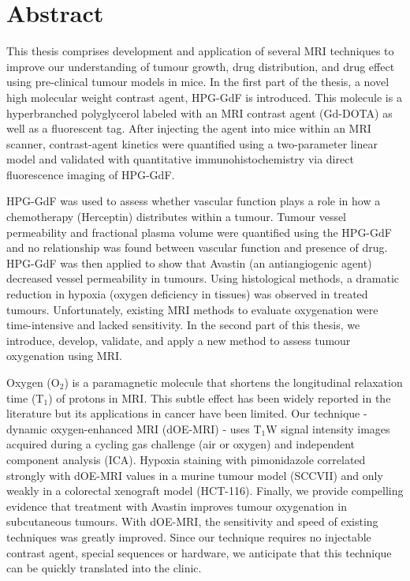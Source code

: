 
\chapter{Abstract}

This thesis comprises development and application of several MRI techniques to improve our understanding of tumour growth, drug distribution, and drug effect using pre-clinical tumour models in mice. In the first part of the thesis, a novel high molecular weight contrast agent, HPG-GdF is introduced. This molecule is a hyperbranched polyglycerol labeled with an MRI contrast agent (Gd-DOTA) as well as a fluorescent tag. After injecting the agent into mice within an MRI scanner, contrast-agent kinetics were quantified using a two-parameter linear model and validated with quantitative immunohistochemistry via direct fluorescence imaging of HPG-GdF.

HPG-GdF was used to assess whether vascular function plays a role in how a chemotherapy (Herceptin) distributes within a tumour. Tumour vessel permeability and fractional plasma volume were quantified using the HPG-GdF and no relationship was found between vascular function and presence of drug. HPG-GdF was then applied to show that Avastin (an antiangiogenic agent) decreased vessel permeability in tumours. Using histological methods, a dramatic reduction in hypoxia (oxygen deficiency in tissues) was observed in treated tumours. Unfortunately, existing MRI methods to evaluate oxygenation were time-intensive and lacked sensitivity. In the second part of this thesis, we introduce, develop, validate, and apply a new method to assess tumour oxygenation using MRI. 

Oxygen (O$_2$) is a paramagnetic molecule that shortens the longitudinal relaxation time (T$_1$) of protons in MRI. This subtle effect has been widely reported in the literature but its applications in cancer have been limited. Our technique - dynamic oxygen-enhanced MRI (\acs{dOE-MRI}) - uses T$_1$W signal intensity images acquired during a cycling gas challenge (air or oxygen) and independent component analysis (ICA). Hypoxia staining with pimonidazole correlated strongly with \acs{dOE-MRI} values in a murine tumour model (SCCVII) and only weakly in a colorectal xenograft model (HCT-116). Finally, we provide compelling evidence that treatment with Avastin improves tumour oxygenation in subcutaneous tumours. With \acs{dOE-MRI}, the sensitivity and speed of existing techniques was greatly improved. Since our technique requires no injectable contrast agent, special sequences or hardware, we anticipate that this technique can be quickly translated into the clinic. 


\vfill
\begin{center}
\begin{sf}
\end{sf}
\end{center}
